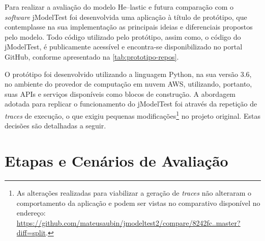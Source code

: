 \documentclass[english,brazilian]{UNISINOSmonografia} %
\begin{document}
Para realizar a avaliação do modelo \textsf{He}--lastic e futura comparação com o \textit{software} jModelTest foi desenvolvida uma aplicação à título de protótipo, que contemplasse na sua implementação as principais ideias e diferenciais propostos pelo modelo.
Todo código utilizado pelo protótipo, assim como, o código do jModelTest, é publicamente acessível e encontra-se disponibilizado no portal GitHub, conforme apresentado na \autoref{tab:prototipo-repos}.


O protótipo foi desenvolvido utilizando a linguagem Python, na sua versão 3.6, no ambiente do provedor de computação em nuvem AWS, utilizando, portanto, suas APIs e serviços disponíveis como blocos de construção.
A abordagem adotada para replicar o funcionamento do jModelTest foi através da repetição de \textit{traces} de execução, o que exigiu pequenas modificações\footnote{
	As alterações realizadas para viabilizar a geração de \textit{traces} não alteraram o comportamento da aplicação e podem ser vistas no comparativo disponível no endereço: \url{https://github.com/mateusaubin/jmodeltest2/compare/8242fc..master?diff=split}.
} no projeto original.
Estas decisões são detalhadas a seguir.








\section{Etapas e Cenários de Avaliação}
\label{sec:metodologia-etapasecenarios}
\end{document}

